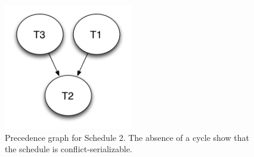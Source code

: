 \begin{figure}[h!]
  \centering
  \includegraphics[width=0.5\textwidth]{images/schedule2}
  \footnotesize
  \caption{Precedence graph for Schedule 2. The absence of a cycle show that the
  schedule is conflict-serializable.}
  \label{fig:schedule2}
\end{figure}
